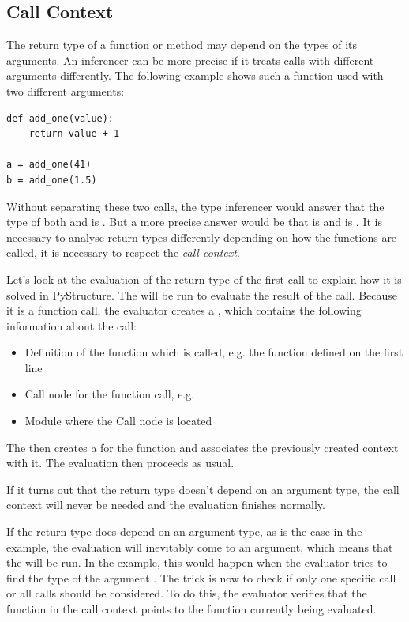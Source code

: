 \documentclass[12pt,halfparskip,DIV11,BCOR10mm]{scrreprt}
\begin{document}
\subsection{Call Context}

The return type of a function or method may depend on the types of its arguments. An inferencer can be more precise if it treats calls with different arguments differently. The following example shows such a function used with two different arguments:

\begin{lstlisting}
def add_one(value):
    return value + 1

a = add_one(41)
b = add_one(1.5)
\end{lstlisting}


Without separating these two calls, the type inferencer would answer that the type of both  and  is . But a more precise answer would be that  is  and  is . It is necessary to analyse return types differently depending on how the functions are called, it is necessary to respect the \emph{call context}.

Let's look at the evaluation of the return type of the first  call to explain how it is solved in PyStructure. The  will be run to evaluate the result of the call. Because it is a function call, the evaluator creates a , which contains the following information about the call:

\begin{itemize}
	\item Definition of the function which is called, e.g. the  function defined on the first line
	\item Call node for the function call, e.g. 
	\item Module where the Call node is located
\end{itemize}

The  then creates a  for the  function and associates the previously created context with it. The evaluation then proceeds as usual.

If it turns out that the return type doesn't depend on an argument type, the call context will never be needed and the evaluation finishes normally.

If the return type does depend on an argument type, as is the case in the example, the evaluation will inevitably come to an argument, which means that the  will be run. In the example, this would happen when the evaluator tries to find the type of the argument . The trick is now to check if only one specific call or all calls should be considered. To do this, the evaluator verifies that the function in the call context points to the function currently being evaluated.
\end{document}
